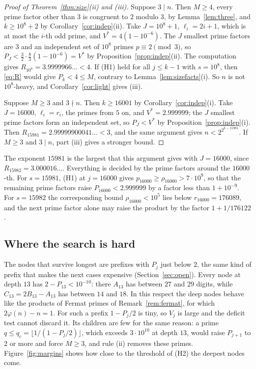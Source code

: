 \documentclass[11pt,reqno]{amsart}
\numberwithin{equation}{section}
\theoremstyle{plain}
\theoremstyle{definition}
\theoremstyle{remark}
\begin{document}
\begin{proof}[Proof of Theorem~\textup{\ref{thm:size}(ii)} and
\textup{(iii)}]
Suppose $3\mid n$. Then $M\ge4$, every prime factor other than $3$ is
congruent to $2$ modulo $3$, by Lemma~\ref{lem:three}, and
$k\ge10^8+2$ by Corollary~\ref{cor:indep}(ii). Take $J=10^8+1$,
$\ell_i=2i+1$, which is at most the $i$-th odd prime, and
$V^*=4(1-10^{-6})$. The $J$ smallest prime factors are $3$ and an
independent set of $10^8$ primes $p\equiv2\pmod3$, so
$P_J<\frac32\cdot\frac83(1-10^{-6})=V^*$ by
Proposition~\ref{prop:indep}(ii). The computation gives
$R_{10^8}=3.9999966\ldots<4$. If (H1) held for all $j\le k-1$ with
$s=10^8$, then \eqref{eq:R} would give $P_k<4\le M$, contrary to
Lemma~\ref{lem:sizefacts}(i). So $n$ is not $10^8$-heavy, and
Corollary~\ref{cor:light} gives (iii).

Suppose $M\ge3$ and $3\nmid n$. Then $k\ge16001$ by
Corollary~\ref{cor:indep}(i). Take $J=16000$, $\ell_i=r_i$, the primes
from $5$ on, and $V^*=2.999999$; the $J$ smallest prime factors form an
independent set, so $P_J<V^*$ by Proposition~\ref{prop:indep}(i).
Then $R_{15981}=2.99999900041\ldots<3$, and the same argument gives
$n<2^{2^{k-15981}}$. If $M\ge3$ and $3\mid n$, part (iii) gives a
stronger bound.
\end{proof}

The exponent $15981$ is the largest that this argument gives with
$J=16000$, since $R_{15982}=3.000016\ldots$. Everything is decided by
the prime factors around the $16000$-th. For $s=15981$, (H1) at
$j=16000$ gives $p_{16000}\ge\rho_{16000}>7\cdot10^9$, so that the
remaining prime factors raise $P_{16000}<2.999999$ by a factor less
than $1+10^{-9}$. For $s=15982$ the corresponding bound
$\rho_{16000}<10^5$ lies below $r_{16000}=176089$, and the next prime
factor alone may raise the product by the factor $1+1/176122$.

\subsection{Where the search is hard}\label{sec:hard}
The nodes that survive longest are prefixes with $P_j$ just below $2$,
the same kind of prefix that makes the next cases expensive
(Section~\ref{sec:open}). Every node at depth $13$ has
$2-P_{13}<10^{-10}$: there $A_{13}$ has between $27$ and $29$ digits,
while $C_{13}=2B_{13}-A_{13}$ has between $14$ and $18$. In this
respect the deep nodes behave like the products of Fermat primes of
Remark~\ref{rem:fermat}, for which $2\varphi(n)-n=1$. For such a
prefix $1-P_j/2$ is tiny, so $V_j$ is large and the deficit test
cannot discard it. Its children are few for the same reason: a prime
$q\le q_c=\lfloor1/(1-P_j/2)\rfloor$, which exceeds $3\cdot10^{10}$ at
depth $13$, would raise $P_{j+1}$ to $2$ or more and force $M\ge3$, and
rule (ii) removes these primes. Figure~\ref{fig:margins} shows how
close to the threshold of (H2) the deepest nodes come.
\end{document}
